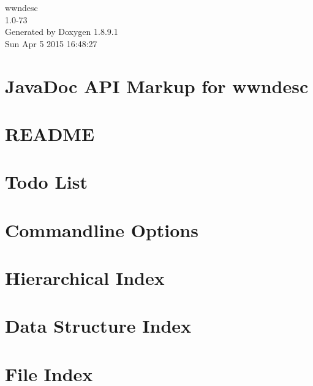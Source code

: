 \documentclass[twoside]{book}
\newcommand{\+}{\discretionary{\mbox{\scriptsize$\hookleftarrow$}}{}{}}
\newcommand{\clearemptydoublepage}{%
  \newpage{\pagestyle{empty}\cleardoublepage}%
}
\begin{document}
\begin{titlepage}
\vspace*{7cm}
\begin{center}%
{\Large wwndesc \\[1ex]\large 1.\+0-\/73 }\\
\vspace*{1cm}
{\large Generated by Doxygen 1.8.9.1}\\
\vspace*{0.5cm}
{\small Sun Apr 5 2015 16:48:27}\\
\end{center}
\end{titlepage}
\clearemptydoublepage
\tableofcontents
\clearemptydoublepage
{}

\chapter{Java\+Doc A\+P\+I Markup for wwndesc}
\label{index}
\chapter{R\+E\+A\+D\+M\+E}
\label{md_htdocs_README}

\chapter{Todo List}
\label{todo}

\chapter{Commandline Options}
\label{cmdopt}

\chapter{Hierarchical Index}

\chapter{Data Structure Index}

\chapter{File Index}

\end{document}
